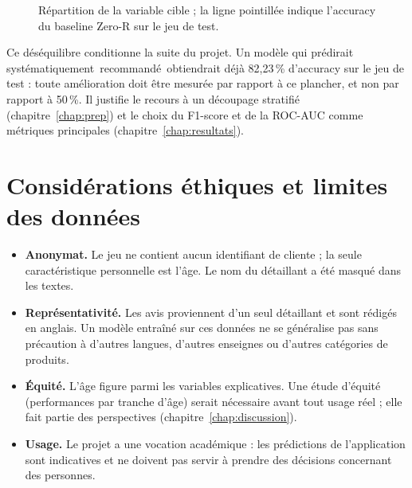 \documentclass[11pt,a4paper]{report}
\def\og{\guillemotleft\nobreak\,}%
\def\fg{\unskip\nobreak\,\guillemotright}%
\newcommand{\gl}[1]{\og #1\fg{}}       %
\numberwithin{equation}{chapter}
\begin{document}
\begin{figure}[!htbp]
\centering
{}
\caption{Répartition de la variable cible ; la ligne pointillée indique l'accuracy du baseline Zero-R sur le jeu de test.}\label{fig:cible}
\end{figure}

Ce déséquilibre conditionne la suite du projet. Un modèle qui prédirait systématiquement \gl{recommandé} obtiendrait déjà 82,23\,\% d'accuracy sur le jeu de test : toute amélioration doit être mesurée par rapport à ce plancher, et non par rapport à 50\,\%. Il justifie le recours à un découpage stratifié (chapitre~\ref{chap:prep}) et le choix du F1-score et de la ROC-AUC comme métriques principales (chapitre~\ref{chap:resultats}).

\section{Considérations éthiques et limites des données}\label{sec:ethique}
\begin{itemize}
\item \textbf{Anonymat.} Le jeu ne contient aucun identifiant de cliente ; la seule caractéristique personnelle est l'âge. Le nom du détaillant a été masqué dans les textes.
\item \textbf{Représentativité.} Les avis proviennent d'un seul détaillant et sont rédigés en anglais. Un modèle entraîné sur ces données ne se généralise pas sans précaution à d'autres langues, d'autres enseignes ou d'autres catégories de produits.
\item \textbf{Équité.} L'âge figure parmi les variables explicatives. Une étude d'équité (performances par tranche d'âge) serait nécessaire avant tout usage réel ; elle fait partie des perspectives (chapitre~\ref{chap:discussion}).
\item \textbf{Usage.} Le projet a une vocation académique : les prédictions de l'application sont indicatives et ne doivent pas servir à prendre des décisions concernant des personnes.
\end{itemize}
\end{document}
